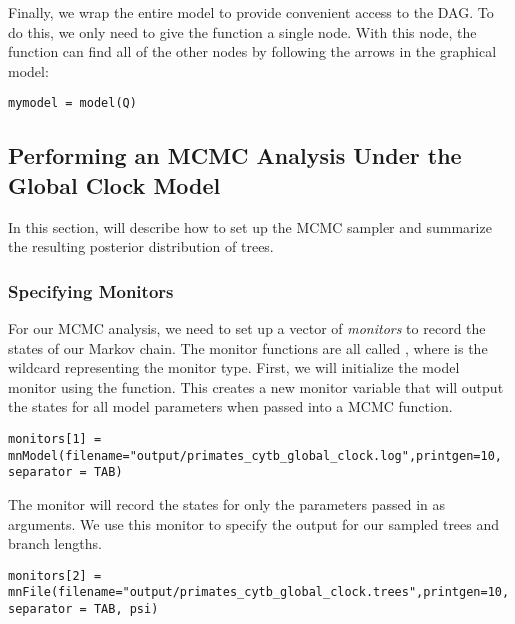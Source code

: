 Finally, we wrap the entire model to provide convenient access to the DAG. 
To do this, we only need to give the  function a single node. 
With this node, the  function can find all of the other nodes by following the arrows in the graphical model:
{\tt \begin{snugshade*}
\begin{lstlisting}
mymodel = model(Q)
\end{lstlisting}
\end{snugshade*}}

\bigskip
\subsection{Performing an MCMC Analysis Under the Global Clock Model}

In this section, will describe how to set up the MCMC sampler and summarize the resulting posterior distribution of trees. 

\subsubsection{Specifying Monitors}

For our MCMC analysis, we need to set up a vector of \textit{monitors} to record the states of our Markov chain. 
The monitor functions are all called , where \cl{*} is the wildcard representing the monitor type.
First, we will initialize the model monitor using the  function. This creates a new monitor variable that will output the states for all model parameters when passed into a MCMC function. 
{\tt \begin{snugshade*}
\begin{lstlisting}
monitors[1] = mnModel(filename="output/primates_cytb_global_clock.log",printgen=10, separator = TAB)
\end{lstlisting}
\end{snugshade*}}

The  monitor will record the states for only the parameters passed in as arguments. We use this monitor to specify the output for our sampled trees and branch lengths.

{\tt \begin{snugshade*}
\begin{lstlisting}
monitors[2] = mnFile(filename="output/primates_cytb_global_clock.trees",printgen=10, separator = TAB, psi)
\end{lstlisting}
\end{snugshade*}}


